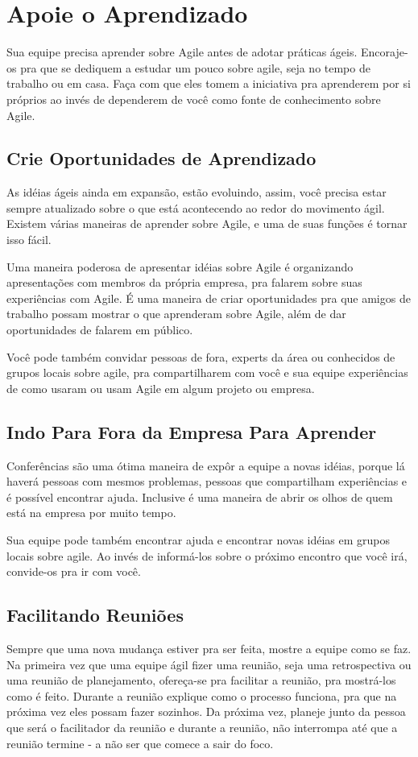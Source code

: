 \documentclass[a4paper, 10pt, font=plain]{abnt}
\begin{document}
\section{Apoie o Aprendizado}
Sua equipe precisa aprender sobre Agile antes de adotar práticas ágeis. Encoraje-os pra que se dediquem a estudar um pouco sobre agile, seja no tempo de trabalho ou em casa. Faça com que eles tomem a iniciativa pra aprenderem por si próprios ao invés de dependerem de você como fonte de conhecimento sobre Agile.


\subsection{Crie Oportunidades de Aprendizado}
As idéias ágeis ainda em expansão, estão evoluindo, assim, você precisa estar sempre atualizado sobre o que está acontecendo ao redor do movimento ágil. Existem várias maneiras de aprender sobre Agile, e uma de suas funções é tornar isso fácil.

Uma maneira poderosa de apresentar idéias sobre Agile é organizando apresentações com membros da própria empresa, pra falarem sobre suas experiências com Agile. É uma maneira de criar oportunidades pra que amigos de trabalho possam mostrar o que aprenderam sobre Agile, além de dar oportunidades de falarem em público.

Você pode também convidar pessoas de fora, experts da área ou conhecidos de grupos locais sobre agile, pra compartilharem com você e sua equipe experiências de como usaram ou usam Agile em algum projeto ou empresa.


\subsection{Indo Para Fora da Empresa Para Aprender}
Conferências são uma ótima maneira de expôr a equipe a novas idéias, porque lá haverá pessoas com mesmos problemas, pessoas que compartilham experiências e é possível encontrar ajuda. Inclusive é uma maneira de abrir os olhos de quem está na empresa por muito tempo.

Sua equipe pode também encontrar ajuda e encontrar novas idéias em grupos locais sobre agile. Ao invés de informá-los sobre o próximo encontro que você irá, convide-os pra ir com você.


\subsection{Facilitando Reuniões}
Sempre que uma nova mudança estiver pra ser feita, mostre a equipe como se faz. Na primeira vez que uma equipe ágil fizer uma reunião, seja uma retrospectiva ou uma reunião de planejamento, ofereça-se pra facilitar a reunião, pra mostrá-los como é feito. Durante a reunião explique como o processo funciona, pra que na próxima vez eles possam fazer sozinhos. Da próxima vez, planeje junto da pessoa que será o facilitador da reunião e durante a reunião, não interrompa até que a reunião termine - a não ser que comece a sair do foco.
\end{document}

